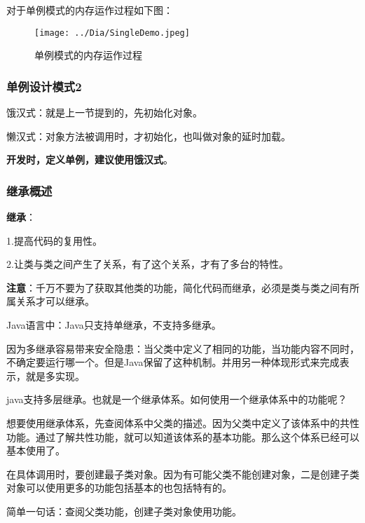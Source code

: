 \documentclass[UTF8]{ctexart}
\begin{document}
对于单例模式的内存运作过程如下图：
\begin{figure}[ht]
\centering
\texttt{[image: ../Dia/SingleDemo.jpeg]}
\caption{单例模式的内存运作过程}
\end{figure}

\subsubsection{单例设计模式2}

饿汉式：就是上一节提到的，先初始化对象。

懒汉式：对象方法被调用时，才初始化，也叫做对象的延时加载。

\textbf{开发时，定义单例，建议使用饿汉式}。

\subsubsection{继承概述}
\textbf{继承}：

1.提高代码的复用性。

2.让类与类之间产生了关系，有了这个关系，才有了多台的特性。

\textbf{注意}：千万不要为了获取其他类的功能，简化代码而继承，必须是类与类之间有所属关系才可以继承。

Java语言中：Java只支持单继承，不支持多继承。

因为多继承容易带来安全隐患：当父类中定义了相同的功能，当功能内容不同时，不确定要运行哪一个。但是Java保留了这种机制。并用另一种体现形式来完成表示，就是多实现。

java支持多层继承。也就是一个继承体系。如何使用一个继承体系中的功能呢？

想要使用继承体系，先查阅体系中父类的描述。因为父类中定义了该体系中的共性功能。通过了解共性功能，就可以知道该体系的基本功能。那么这个体系已经可以基本使用了。

在具体调用时，要创建最子类对象。因为有可能父类不能创建对象，二是创建子类对象可以使用更多的功能包括基本的也包括特有的。

简单一句话：查阅父类功能，创建子类对象使用功能。

\end{document}
